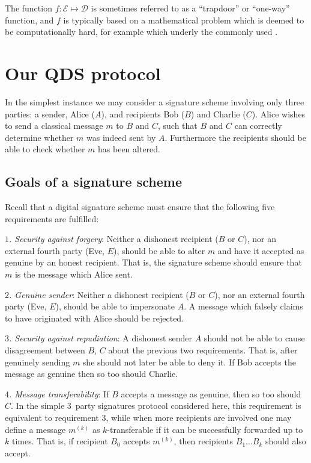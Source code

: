 The function $f: \mathcal{E} \mapsto \mathcal{D}$ is sometimes referred to as a ``trapdoor'' or ``one-way'' function, and $f$ is typically based on a mathematical problem which is deemed to be computationally hard, for example  which underly the commonly used . 


\section{Our QDS protocol}\label{sec:qds_protocol}

In the simplest instance we may consider a signature scheme involving only three parties: a sender, Alice ($A$), and recipients Bob ($B$) and Charlie ($C$). Alice wishes to send a classical message $m$ to $B$ and $C$, such that $B$ and $C$ can correctly determine whether $m$ was indeed sent by $A$. Furthermore the recipients should be able to check whether $m$ has been altered.

\subsection{Goals of a signature scheme}

Recall that a digital signature scheme must ensure that the following five requirements are fulfilled:

\noindent \emph{$1$. Security against forgery}: Neither a dishonest recipient ($B$ or $C$), nor an external fourth party (Eve, $E$), should be able to alter $m$ and have it accepted as genuine by an honest recipient. That is, the signature scheme should ensure that $m$ is the message which Alice sent.

\noindent \emph{$2$. Genuine sender}: Neither a dishonest recipient ($B$ or $C$), nor an external fourth party (Eve, $E$), should be able to impersonate $A$. A message which falsely claims to have originated with Alice should be rejected.

\noindent \emph{$3$. Security against repudiation}: A dishonest sender $A$ should not be able to cause disagreement between $B$, $C$ about the previous two requirements. That is, after genuinely sending $m$ she should not later be able to deny it. If Bob accepts the message as genuine then so too should Charlie. 

\noindent \emph{$4$. Message transferability}: If $B$ accepts a message as genuine, then so too should $C$. In the simple $3$~party signatures protocol considered here, this requirement is equivalent to requirement $3$, while when more recipients are involved one may define a message $m^{\left(k\right)}$ as $k$-transferable if it can be successfully forwarded up to $k$ times. That is, if recipient $B_0$ accepts $m^{\left(k\right)}$, then recipients $B_1 \dots B_k$ should also accept.

